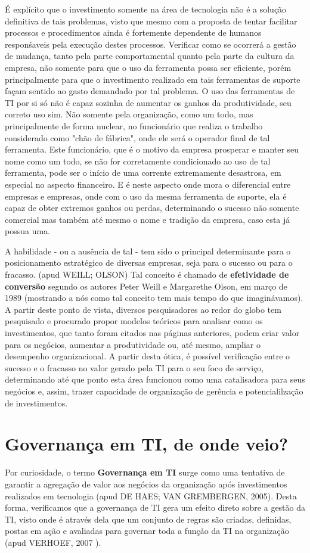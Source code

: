 É explícito que o investimento somente na área de tecnologia não é a solução definitiva de tais problemas, visto que mesmo com a proposta de tentar facilitar processos e procedimentos ainda é fortemente dependente de humanos responśaveis pela execução destes processos. Verificar como se ocorrerá a gestão de mudança, tanto pela parte comportamental quanto pela parte da cultura da empresa, não somente para que o uso da ferramenta possa ser eficiente, porém principalmente para que o investimento realizado em tais ferramentas de suporte façam sentido ao gasto demandado por tal problema. O uso das ferramentas de TI por si só não é capaz sozinha de aumentar os ganhos da produtividade, seu correto uso sim. Não somente pela organização, como um todo, mas principalmente de forma nuclear, no funcionário que realiza o trabalho considerado como "chão de fábrica", onde ele será o operador final de tal ferramenta. Este funcionário, que é o motivo da empresa prosperar e manter seu nome como um todo, se não for corretamente condicionado ao uso de tal ferramenta, pode ser o início de uma corrente extremamente desastrosa, em especial no aspecto financeiro. E é neste aspecto onde mora o diferencial entre empresas e empresas, onde com o uso da mesma ferramenta de suporte, ela é capaz de obter extremos ganhos ou perdas, determinando o sucesso não somente comercial mas também até mesmo o nome e tradição da empresa, caso esta já possua uma.

A habilidade - ou a ausência de tal - tem sido o principal determinante para o posicionamento estratégico de diversas empresas, seja para o sucesso ou para o fracasso. (apud WEILL; OLSON\cite{WEILL}) Tal conceito é chamado de {\bf efetividade de conversão} segundo os autores Peter Weill e Margarethe Olson, em março de 1989 (mostrando a nós como tal conceito tem mais tempo do que imaginávamos). A partir deste ponto de vista, diversos pesquisadores ao redor do globo tem pesquisado e procurado propor modelos teóricos para analisar como os investimentos, que tanto foram citados nas páginas anteriores, podem criar valor para os negócios, aumentar a produtividade ou, até mesmo, ampliar o desempenho organizacional. A partir desta ótica, é possível verificação entre o sucesso e o fracasso no valor gerado pela TI para o seu foco de serviço, determinando até que ponto esta área funcionou como uma catalisadora para seus negócios e, assim, trazer capacidade de organização de gerência e potencialilzação de investimentos.

\section{Governança em TI, de onde veio?}
Por curiosidade, o termo {\bf Governança em TI} surge como uma tentativa de garantir a agregação de valor aos negócios da organização após investimentos realizados em tecnologia (apud DE HAES; VAN GREMBERGEN, 2005)\cite{DEHAES2005}. Desta forma, verificamos que a governança de TI gera um efeito direto sobre a gestão da TI, visto onde é através dela que um conjunto de regras são criadas, definidas, postas em ação e avaliadas para governar toda a função da TI na organização (apud VERHOEF, 2007 \cite{VERHOEFF}).

